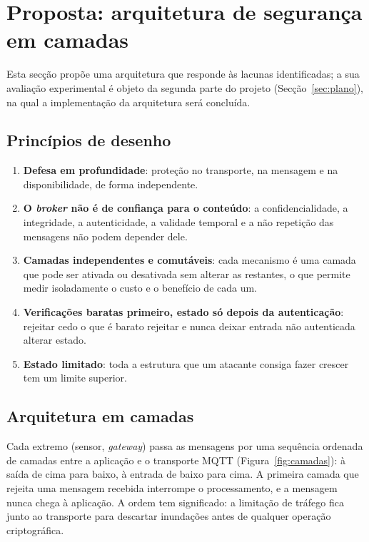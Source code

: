 \section{Proposta: arquitetura de segurança em camadas}
\label{sec:proposta}

Esta secção propõe uma arquitetura que responde às lacunas identificadas; a sua
avaliação experimental é objeto da segunda parte do projeto
(Secção~\ref{sec:plano}), na qual a implementação da arquitetura será concluída.

\subsection{Princípios de desenho}

\begin{enumerate}[label=\textbf{D\arabic*.}, leftmargin=*]
  \item \textbf{Defesa em profundidade}: proteção no transporte, na mensagem e na
    disponibilidade, de forma independente.
  \item \textbf{O \emph{broker} não é de confiança para o conteúdo}: a
    confidencialidade, a integridade, a autenticidade, a validade temporal e a
    não repetição das mensagens não podem depender dele.
  \item \textbf{Camadas independentes e comutáveis}: cada mecanismo é uma camada
    que pode ser ativada ou desativada sem alterar as restantes, o que permite medir
    isoladamente o custo e o benefício de cada um.
  \item \textbf{Verificações baratas primeiro, estado só depois da autenticação}:
    rejeitar cedo o que é barato rejeitar e nunca deixar entrada não autenticada
    alterar estado.
  \item \textbf{Estado limitado}: toda a estrutura que um atacante consiga fazer
    crescer tem um limite superior.
\end{enumerate}

\subsection{Arquitetura em camadas}
\label{sec:arquitetura}

Cada extremo (sensor, \emph{gateway}) passa as mensagens por uma sequência ordenada
de camadas entre a aplicação e o transporte MQTT (Figura~\ref{fig:camadas}): à
saída de cima para baixo, à entrada de baixo para cima. A primeira camada que
rejeita uma mensagem recebida interrompe o processamento, e a mensagem nunca chega à
aplicação. A ordem tem significado: a limitação de tráfego fica junto ao transporte
para descartar inundações antes de qualquer operação criptográfica.

